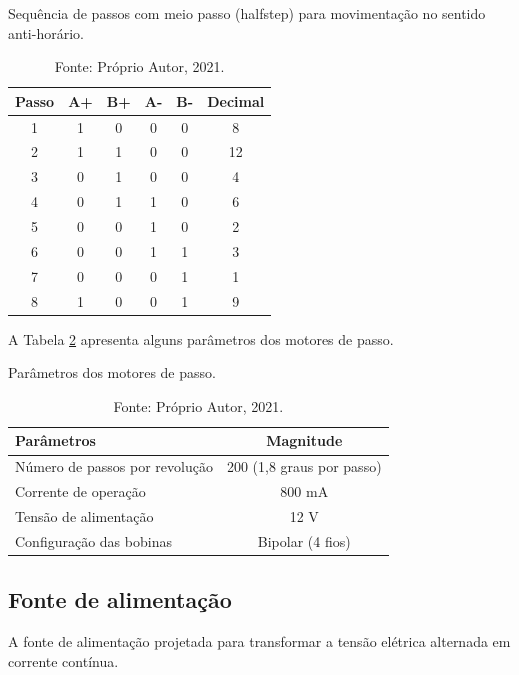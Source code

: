 \begin{table}
    \centering
    \caption{Sequência de passos com meio passo (halfstep) para movimentação no sentido anti-horário.}
    \begin{tabular}{cccccc}
        \hline
        \textbf{Passo} & \textbf{A+} & \textbf{B+} & \textbf{A-} & \textbf{B-} & \textbf{Decimal}\\
        \hline
        1 & 1 & 0 & 0 & 0 & 8\\
        2 & 1 & 1 & 0 & 0 & 12\\
        3 & 0 & 1 & 0 & 0 & 4\\
        4 & 0 & 1 & 1 & 0 & 6\\
        5 & 0 & 0 & 1 & 0 & 2\\
        6 & 0 & 0 & 1 & 1 & 3\\
        7 & 0 & 0 & 0 & 1 & 1\\
        8 & 1 & 0 & 0 & 1 & 9\\
        \hline       
    \end{tabular}
    \caption*{Fonte: Próprio Autor, 2021.}
    \label{tab:halfstepantihorario}
\end{table}

A Tabela \ref{tab:pmotordepasso} apresenta alguns parâmetros dos motores de passo.

\begin{table}
    \centering
    \caption{Parâmetros dos motores de passo.}
    \begin{tabular}{lc}
        \hline
        \textbf{Parâmetros} & \textbf{Magnitude}\\
        \hline
        Número de passos por revolução & 200 (1,8 graus por passo)\\
        Corrente de operação & 800 mA\\
        Tensão de alimentação & 12 V\\
        Configuração das bobinas & Bipolar (4 fios)\\
        \hline       
    \end{tabular}
    \caption*{Fonte: Próprio Autor, 2021.}
    \label{tab:pmotordepasso}
\end{table}

\subsection{Fonte de alimentação}\label{subsec:metfonte}

A fonte de alimentação projetada para transformar a tensão elétrica alternada em corrente contínua.

